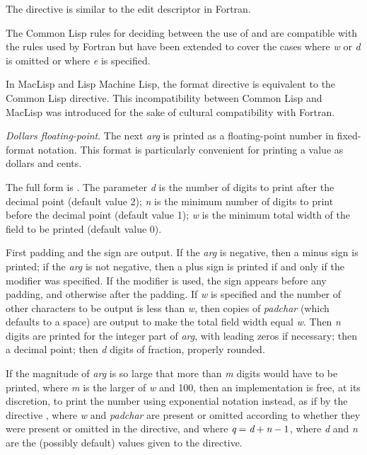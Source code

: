 \begin{flushdesc}
\beforenoterule
\begin{incompatibility}
The  directive is similar to the
 edit descriptor in Fortran.

The Common Lisp rules for deciding between the use of 
and  are compatible with the rules used by Fortran
but have been extended to cover the cases where \emph{w} or \emph{d}
is omitted or where \emph{e} is specified.

In MacLisp and Lisp Machine Lisp, the  format directive is equivalent
to the Common Lisp \cd{{\Xtilde}{\Xatsign}*} directive.  This incompatibility between
Common Lisp and MacLisp was introduced for the sake of cultural compatibility
with Fortran.
\end{incompatibility}
\afternoterule

\item[\cd{{\Xtilde}\$}]
\emph{Dollars floating-point}.  The next \emph{arg} is printed as a floating-point
number in fixed-format notation.  This format is particularly
convenient for printing a value as dollars and cents.

The full form is .
The parameter \emph{d} is the number
of digits to print after the decimal point (default value 2);
\emph{n} is the minimum number of digits to print before the decimal
point (default value 1);
\emph{w} is the minimum total width of the field to be printed (default
value 0).

First padding and the sign are output.
If the \emph{arg} is negative, then a minus sign is printed;
if the \emph{arg} is not negative, then a plus sign is printed
if and only if the \cd{{\Xatsign}} modifier was specified.  
If the \cd{:} modifier is used, the sign appears before any padding,
and otherwise after the padding.
If \emph{w} is specified and the number of other characters to be output
is less than \emph{w}, then copies of \emph{padchar} (which defaults
to a space) are output to
make the total field width equal \emph{w}.
Then \emph{n} digits are printed for the integer part of \emph{arg},
with leading zeros if necessary; then a decimal point;
then \emph{d} digits of fraction, properly rounded.

If the magnitude of \emph{arg} is so large that more than \emph{m} digits would
have to be printed, where \emph{m} is the larger of \emph{w} and 100, then an
implementation is free, at its discretion, to print the number using
exponential notation instead, as if by the directive
, where \emph{w} and \emph{padchar} are
present or omitted according to whether they were present or omitted in
the \cd{{\Xtilde}\$} directive, and where $\emph{q}=\emph{d}+\emph{n}-1$,
where \emph{d} and \emph{n} are the (possibly default) values given to the
\cd{{\Xtilde}\$} directive.


\end{flushdesc}
